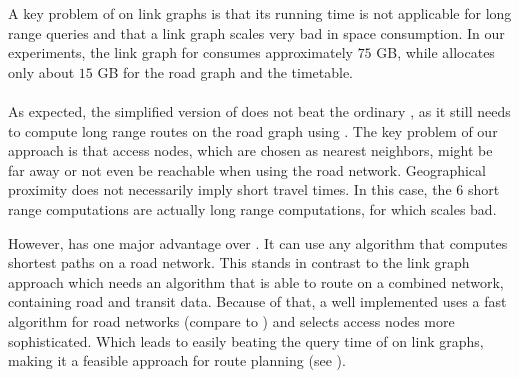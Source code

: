 	A key problem of \dijkstra on link graphs is that its running time is not applicable for long range queries and that a link graph scales
	very bad in space consumption. In our experiments, the link graph for \switzerlandR consumes approximately $75$ GB, while \anr allocates
	only about $15$ GB for the road graph and the timetable.\\\\
	As expected, the simplified version of \anr does not beat the ordinary \dijkstra, as it still needs to compute long range routes on the road graph
	using \dijkstra. The key problem of our approach is that access nodes, which are chosen as nearest neighbors, might be far away or not even
	be reachable when using the road network. Geographical proximity does not necessarily imply short travel times.
	In this case, the $6$ short range \dijkstra computations are actually long range computations, for which \dijkstra scales bad.
	
	However, \anr has one major advantage over \dijkstra. It can use any algorithm that computes shortest paths on a road network.
	This stands in contrast to the link graph approach which needs an algorithm that is able to route on a combined network, containing
	road and transit data. Because of that, a well implemented \anr uses a fast algorithm for road networks
	(compare to ) and selects access nodes more sophisticated. Which leads
	to \anr easily beating the query time of \dijkstra on link graphs, making it a feasible approach for \multiModal route planning
	(see ).